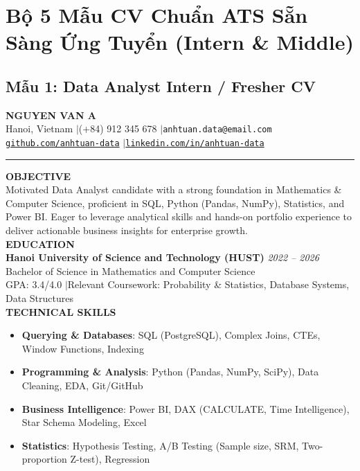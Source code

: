 \section{Bộ 5 Mẫu CV Chuẩn ATS Sẵn Sàng Ứng Tuyển (Intern \& Middle)}

\subsection{Mẫu 1: Data Analyst Intern / Fresher CV}
\begin{samplecvbox}
{\centering
    {\LARGE \textbf{NGUYEN VAN A}}\\[2pt]
    \small Hanoi, Vietnam \enspace$|$\enspace (+84) 912 345 678 \enspace$|$\enspace \texttt{anhtuan.data@email.com}\\
    \href{https://github.com/anhtuan-data}{\texttt{github.com/anhtuan-data}} \enspace$|$\enspace \href{https://linkedin.com/in/anhtuan-data}{\texttt{linkedin.com/in/anhtuan-data}}\\[6pt]
}
\hrule\vspace{6pt}

\textbf{\large OBJECTIVE}\\
Motivated Data Analyst candidate with a strong foundation in Mathematics \& Computer Science, proficient in SQL, Python (Pandas, NumPy), Statistics, and Power BI. Eager to leverage analytical skills and hands-on portfolio experience to deliver actionable business insights for enterprise growth.\\[6pt]

\textbf{\large EDUCATION}\\
\textbf{Hanoi University of Science and Technology (HUST)} \hfill \textit{2022 -- 2026}\\
Bachelor of Science in Mathematics and Computer Science\\
GPA: 3.4/4.0 \enspace$|$\enspace Relevant Coursework: Probability \& Statistics, Database Systems, Data Structures\\[6pt]

\textbf{\large TECHNICAL SKILLS}
\begin{itemize}[leftmargin=12pt, nosep]
    \item \textbf{Querying \& Databases}: SQL (PostgreSQL), Complex Joins, CTEs, Window Functions, Indexing
    \item \textbf{Programming \& Analysis}: Python (Pandas, NumPy, SciPy), Data Cleaning, EDA, Git/GitHub
    \item \textbf{Business Intelligence}: Power BI, DAX (CALCULATE, Time Intelligence), Star Schema Modeling, Excel
    \item \textbf{Statistics}: Hypothesis Testing, A/B Testing (Sample size, SRM, Two-proportion Z-test), Regression
\end{itemize}\vspace{6pt}


\end{samplecvbox}
